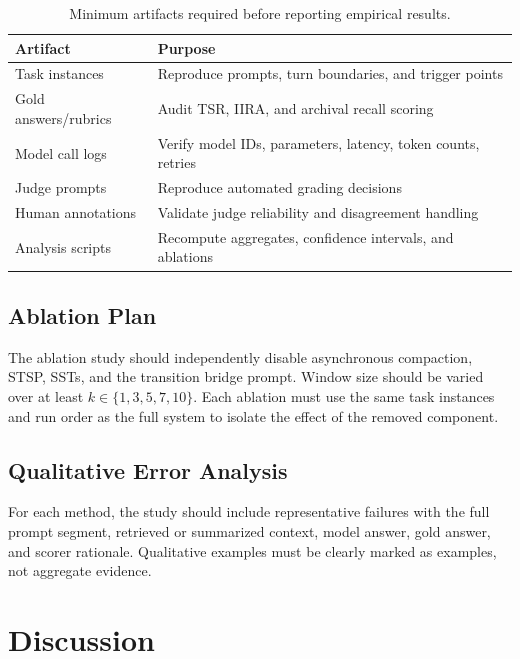 \documentclass[10pt,twocolumn]{article}
\begin{document}
\begin{table}[h]
\centering
\caption{Minimum artifacts required before reporting empirical results.}
\label{tab:artifacts}
\small
\begin{tabular}{@{}ll@{}}
\toprule
\textbf{Artifact} & \textbf{Purpose} \\
\midrule
Task instances & Reproduce prompts, turn boundaries, and trigger points \\
Gold answers/rubrics & Audit TSR, IIRA, and archival recall scoring \\
Model call logs & Verify model IDs, parameters, latency, token counts, retries \\
Judge prompts & Reproduce automated grading decisions \\
Human annotations & Validate judge reliability and disagreement handling \\
Analysis scripts & Recompute aggregates, confidence intervals, and ablations \\
\bottomrule
\end{tabular}
\end{table}

\subsection{Ablation Plan}\label{sec:ablation}

The ablation study should independently disable asynchronous compaction, STSP, SSTs, and the transition bridge prompt. Window size should be varied over at least $k \in \{1,3,5,7,10\}$. Each ablation must use the same task instances and run order as the full system to isolate the effect of the removed component.

\subsection{Qualitative Error Analysis}\label{sec:case_study}

For each method, the study should include representative failures with the full prompt segment, retrieved or summarized context, model answer, gold answer, and scorer rationale. Qualitative examples must be clearly marked as examples, not aggregate evidence.


\section{Discussion}\label{sec:discussion}
\end{document}
